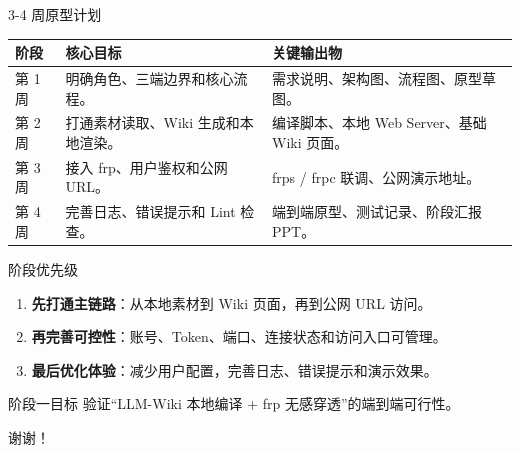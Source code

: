 \documentclass[aspectratio=169]{beamer}
\newcommand{\keypoint}[1]{\textcolor{whu}{\textbf{#1}}}
\begin{document}
\begin{frame}{3-4 周原型计划}
    \small
    \begin{tabularx}{\textwidth}{>{\raggedright\arraybackslash}p{}p{}X}
        \toprule
        \textbf{阶段} & \textbf{核心目标} & \textbf{关键输出物} \\
        \midrule
        第 1 周 & 明确角色、三端边界和核心流程。 & 需求说明、架构图、流程图、原型草图。 \\
        第 2 周 & 打通素材读取、Wiki 生成和本地渲染。 & 编译脚本、本地 Web Server、基础 Wiki 页面。 \\
        第 3 周 & 接入 frp、用户鉴权和公网 URL。 & frps / frpc 联调、公网演示地址。 \\
        第 4 周 & 完善日志、错误提示和 Lint 检查。 & 端到端原型、测试记录、阶段汇报 PPT。 \\
        \bottomrule
    \end{tabularx}
\end{frame}

\begin{frame}{阶段优先级}
    \begin{enumerate}
        \item \keypoint{先打通主链路}：从本地素材到 Wiki 页面，再到公网 URL 访问。
        \item \keypoint{再完善可控性}：账号、Token、端口、连接状态和访问入口可管理。
        \item \keypoint{最后优化体验}：减少用户配置，完善日志、错误提示和演示效果。
    \end{enumerate}

    \vspace{0.35cm}
    \begin{alertblock}{阶段一目标}
        验证“LLM-Wiki 本地编译 + frp 无感穿透”的端到端可行性。
    \end{alertblock}

    \vspace{0.25cm}
    \centering
    \Large 谢谢！
\end{frame}
\end{document}
